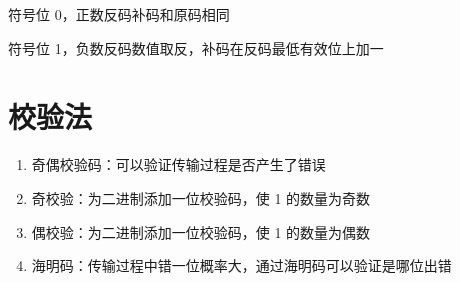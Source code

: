 符号位 0，正数反码补码和原码相同

符号位 1，负数反码数值取反，补码在反码最低有效位上加一

\section{校验法}

\begin{enumerate}

    \item 奇偶校验码：可以验证传输过程是否产生了错误
    \item 奇校验：为二进制添加一位校验码，使 1 的数量为奇数
    \item 偶校验：为二进制添加一位校验码，使 1 的数量为偶数
    \item 海明码：传输过程中错一位概率大，通过海明码可以验证是哪位出错

\end{enumerate}

\newpage
